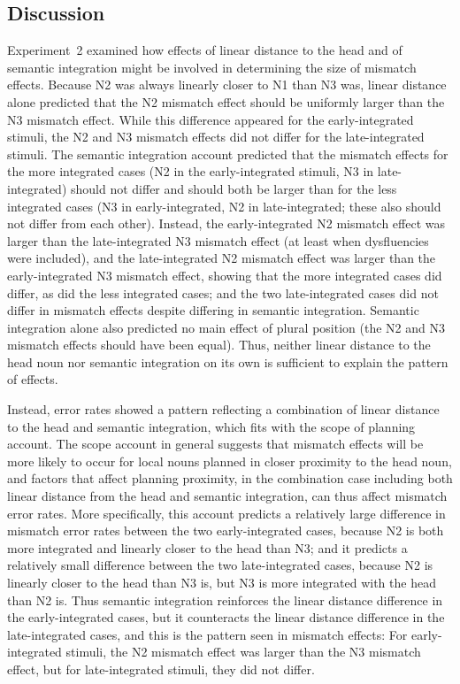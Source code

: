 \documentclass[12pt,titlepage]{article}
\begin{document}
\subsection{Discussion}

Experiment~2 examined how effects of linear distance to the head and of
semantic integration might be involved in determining the size of mismatch
effects.  Because N2 was always linearly closer to N1 than N3 was, linear
distance alone predicted that the N2 mismatch effect should be uniformly
larger than the N3 mismatch effect.  While this difference appeared for the
early-integrated stimuli, the N2 and N3 mismatch effects did not differ for
the late-integrated stimuli.  The semantic integration account predicted
that the mismatch effects for the more integrated cases (N2 in the
early-integrated stimuli, N3 in late-integrated) should not differ and
should both be larger than for the less integrated cases (N3 in
early-integrated, N2 in late-integrated; these also should not differ from
each other).  Instead, the early-integrated N2 mismatch effect was larger
than the late-integrated N3 mismatch effect (at least when dysfluencies
were included), and the late-integrated N2 mismatch effect was larger than
the early-integrated N3 mismatch effect, showing that the more integrated
cases did differ, as did the less integrated cases; and the two
late-integrated cases did not differ in mismatch effects despite differing
in semantic integration.  Semantic integration alone also predicted no main
effect of plural position (the N2 and N3 mismatch effects should have been
equal).  Thus, neither linear distance to the head noun nor semantic
integration on its own is sufficient to explain the pattern of effects.

Instead, error rates showed a pattern reflecting a combination of linear
distance to the head and semantic integration, which fits with the scope of
planning account.  The scope account in general suggests that mismatch
effects will be more likely to occur for local nouns planned in closer
proximity to the head noun, and factors that affect planning proximity, in
the combination case including both linear distance from the head and
semantic integration, can thus affect mismatch error rates.  More
specifically, this account predicts a relatively large difference in
mismatch error rates between the two early-integrated cases, because N2 is
both more integrated and linearly closer to the head than N3; and it
predicts a relatively small difference between the two late-integrated
cases, because N2 is linearly closer to the head than N3 is, but N3 is more
integrated with the head than N2 is.  Thus semantic integration reinforces
the linear distance difference in the early-integrated cases, but it
counteracts the linear distance difference in the late-integrated cases,
and this is the pattern seen in mismatch effects: For early-integrated
stimuli, the N2 mismatch effect was larger than the N3 mismatch effect, but
for late-integrated stimuli, they did not differ.
\end{document}
